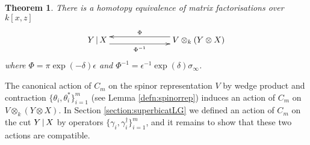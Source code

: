 \documentclass[english,letter paper,12pt,leqno]{article}
\newtheorem{theorem}{Theorem}[section]
\theoremstyle{example}
\numberwithin{equation}{section}
\begin{document}
\begin{theorem}\label{theorem:htpy_equivalence_main} There is a homotopy equivalence of matrix factorisations over $k[x,z]$
\begin{equation}\label{eq:final_finite_model}
\xymatrix@C+4pc{
Y \l X \ar@<-1ex>[r]_-{\Phi^{-1}} & V \otimes_k ( Y \otimes X )\ar@<-1ex>[l]_-{\Phi}
}
\end{equation}
where $\Phi = \pi \exp(-\delta) \epsilon$ and $\Phi^{-1} = \epsilon^{-1} \exp(\delta) \sigma_\infty$.
\end{theorem}

The canonical action of $C_m$ on the spinor representation $V$ by wedge product and contraction $\{ \theta_i, \theta_i^* \}_{i=1}^m$ (see Lemma \ref{defn:spinorrep}) induces an action  of $C_m$ on $V \otimes_k ( Y \otimes X )$. In Section \ref{section:superbicatLG} we defined an action of $C_m$ on the cut $Y \,|\, X$ by operators $\{ \gamma_i, \gamma_i^\dagger \}_{i=1}^m$, and it remains to show that these two actions are compatible.
\end{document}
